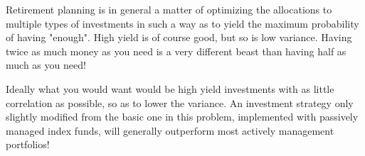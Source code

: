 \begin{enumerate}[label=\textbf{\Alph*}.]
    Retirement planning is in general a matter of optimizing the allocations to multiple types of investments in such a way as to yield the maximum probability of having "enough". High yield is of course good, but so is low variance. Having twice as much money as you need is a very different beast than having half as much as you need!

    Ideally what you would want would be high yield investments with as little correlation as possible, so as to lower the variance. An investment strategy only slightly modified from the basic one in this problem, implemented with passively managed index funds, will generally outperform most actively management portfolios!

\end{enumerate}

